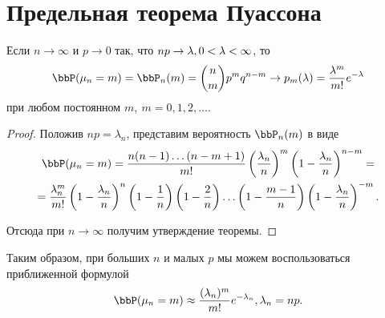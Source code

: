 \section{Предельная теорема Пуассона}
\begin{thm} 
Если $n \to \infty$ и $p \to 0$ так, что $np \to \lambda, \:\\ 0 < \lambda < \infty$, то
$$
\bbP(\mu_n = m) = \bbP_n(m) = \binom n m p^mq^{n - m} \to p_m(\lambda) = \frac{\lambda^m}{m!} e^{-\lambda}
$$
при любом постоянном $m, \: m = 0,1,2,\dots$.
\end{thm}

\begin{proof}
Положив $np = \lambda_n$, представим вероятность $\bbP_n(m)$ в виде
\begin{multline*}
\bbP(\mu_n = m) = \frac{n(n - 1)\ldots(n - m + 1)}{m!} \left( \frac{\lambda_n}{n}\right)^m\left( 1 - \frac{\lambda_n}{n}\right)^{n - m} = \\
= \frac{\lambda_n^m}{m!} \left( 1 - \frac{\lambda_n}{n}\right)^n \left( 1 - \frac{1}{n}\right)\left(1 - \frac{2}{n} \right) \ldots \left( 1 - \frac{m - 1}{n}\right)\left(1 - \frac{\lambda_n}{n} \right)^{-m}.
\end{multline*}

Отсюда при $n \to \infty$ получим утверждение теоремы.
\end{proof}

Таким образом, при больших $n$ и малых $p$ мы можем воспользоваться приближенной формулой
$$
\bbP(\mu_n = m) \approx \frac{(\lambda_n)^m}{m!} e^{-\lambda_n},	\lambda_n = np.
$$
